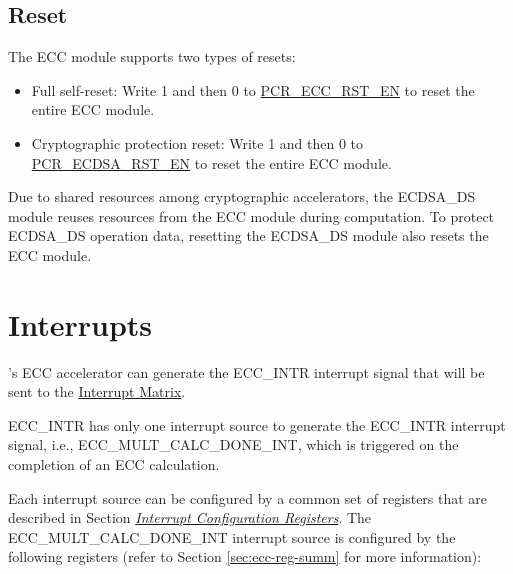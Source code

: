 \documentclass[main\_\_EN.tex]{subfiles}
\begin{document}
\subsection{Reset}
\label{sec:ecc-reset}

The ECC module supports two types of resets:

\begin{itemize}
    \item Full self-reset: Write 1 and then 0 to \hyperref[fielddesc:PCRECCRSTEN]{PCR\_ECC\_RST\_EN} to reset the entire ECC module.
    \item Cryptographic protection reset: Write 1 and then 0 to \hyperref[fielddesc:PCRECDSARSTEN]{PCR\_ECDSA\_RST\_EN} to reset the entire ECC module.
\end{itemize}

\begin{tiplisting}
Due to shared resources among cryptographic accelerators, the ECDSA\_DS module reuses resources from the ECC module during computation. To protect ECDSA\_DS operation data, resetting the ECDSA\_DS module also resets the ECC module.
\end{tiplisting}


\section{Interrupts}
\label{sec:ecc-interrupt}

\chipname{}'s ECC accelerator can generate the ECC\_INTR interrupt signal that will be sent to the \hyperref[mod:intmtrx]{Interrupt Matrix}.

ECC\_INTR has only one interrupt source to generate the ECC\_INTR interrupt signal, i.e., \label{int:ECCMULTCALCDONEINT}{ECC\_MULT\_CALC\_DONE\_INT}, which is triggered on the completion of an ECC calculation.

Each interrupt source can be configured by a common set of registers that are described in Section \hyperref[interrupt-config-registers]{\textit{Interrupt Configuration Registers}}. The ECC\_MULT\_CALC\_DONE\_INT interrupt source is configured by the following registers (refer to Section \ref{sec:ecc-reg-summ} \textit{} for more information):
\end{document}
